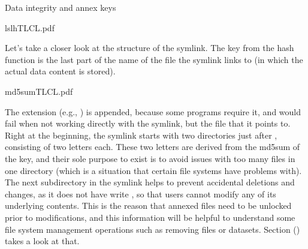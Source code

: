 \begin{findoutmore}[label={fom-objecttree}, before title={\thetcbcounter\ }, float, floatplacement=tbp, check odd page=true]{Data integrity and annex keys}
\begin{sphinxVerbatim}[commandchars=\\\{\}]
ls\PYGZhy{}lhTLCL.pdf
\end{sphinxVerbatim}

\sphinxAtStartPar
Let’s take a closer look at the structure of the symlink.
The key from the hash function is the last part of the name of the file the symlink links to (in which the actual data content is stored).

\ignorespaces 
\def\sphinxLiteralBlockLabel{\label{\detokenize{basics/101-115-symlinks:index-5}}}
\begin{sphinxVerbatim}[commandchars=\\\{\}]
md5sumTLCL.pdf
\end{sphinxVerbatim}

\sphinxAtStartPar
The extension (e.g., ) is appended, because some programs require it, and would fail when not working directly with the symlink, but the file that it points to.
Right at the beginning, the symlink starts with two directories just after ,
consisting of two letters each.
These two letters are derived from the md5sum of the key, and their sole purpose to exist is to avoid issues with too many files in one directory (which is a situation that certain file systems have problems with).
The next subdirectory in the symlink helps to prevent accidental deletions and changes, as it does not have write {\hyperref[\detokenize{glossary:term-permissions}]{}}, so that users cannot modify any of its underlying contents.
This is the reason that annexed files need to be unlocked prior to modifications, and this information will be helpful to understand some file system management operations such as removing files or datasets. Section {\hyperref[\detokenize{basics/101-136-filesystem:file-system}]{}} () takes a look at that.


\end{findoutmore}
